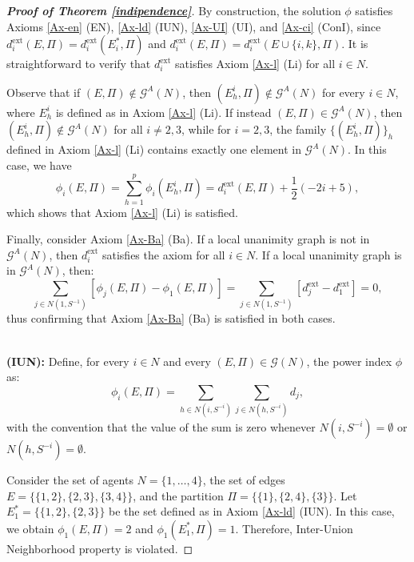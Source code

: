 \documentclass[preprint,11pt,authoryear]{elsarticle}
\theoremstyle{plain}
\begin{document}
\begin{proof}[\bf Proof of Theorem \ref{indipendence}]
	By construction, the solution $\phi$ satisfies Axioms \ref{Ax-en} (EN), \ref{Ax-ld} (IUN), \ref{Ax-UI} (UI), and \ref{Ax-ci} (ConI), since $d_i^{\text{ext}}(E,\Pi) = d_i^{\text{ext}}(E_i^*,\Pi)$ and $d_i^{\text{ext}}(E,\Pi) = d_i^{\text{ext}}(E \cup \{i,k\},\Pi)$. It is straightforward to verify that $d_i^{\text{ext}}$ satisfies Axiom \ref{Ax-l} (Li) for all $i \in N$. 
	
	Observe that if $(E,\Pi) \notin \mathcal{G}^A(N)$, then $(E_h^i,\Pi) \notin \mathcal{G}^A(N)$ for every $i \in N$, where $E_h^i$ is defined as in Axiom \ref{Ax-l} (Li). If instead $(E,\Pi) \in \mathcal{G}^A(N)$, then $(E_h^i,\Pi) \notin \mathcal{G}^A(N)$ for all $i \neq 2,3$, while for $i = 2,3$, the family $\{(E_h^i,\Pi)\}_h$ defined in Axiom \ref{Ax-l} (Li) contains exactly one element in $\mathcal{G}^A(N)$. In this case, we have
	\[
	\phi_i(E,\Pi) = \sum_{h=1}^p \phi_i(E_h^i,\Pi) = d_i^{\text{ext}}(E,\Pi) + \frac{1}{2}(-2i + 5),
	\]
	which shows that Axiom \ref{Ax-l} (Li) is satisfied. 
	
	
	Finally, consider Axiom \ref{Ax-Ba} (Ba). If a local unanimity graph is not in $\mathcal{G}^A(N)$, then $d_i^{\text{ext}}$ satisfies the axiom for all $i \in N$. If a local unanimity graph is in $\mathcal{G}^A(N)$, then:
	\[
	\sum_{j \in N(1,S^{-1})} \left[\phi_j(E,\Pi) - \phi_1(E,\Pi)\right] = \sum_{j \in N(1,S^{-1})} \left[d_j^{\text{ext}} - d_1^{\text{ext}}\right] = 0,
	\]
	thus confirming that Axiom \ref{Ax-Ba} (Ba) is satisfied in both cases.
	
	
	
	
	\noindent\vspace{.5\baselineskip}\\
	\textbf{(IUN):} 
	Define, for every $i \in N$ and every $(E, \Pi) \in \mathcal{G}(N)$, the power index $\phi$ as:
	\begin{equation*}
		\phi_i(E,\Pi) = \sum_{h \in N(i, S^{-i})} \sum_{j \in N(h, S^{-i})} d_j,
	\end{equation*}
	with the convention that the value of the sum is zero whenever $N(i, S^{-i}) = \emptyset$ or $N(h, S^{-i}) = \emptyset$. 
	
	Consider the set of agents $N = \{1, \ldots, 4\}$, the set of edges $E = \big\{\{1,2\}, \{2,3\}, \{3,4\}\big\}$, and the partition $\Pi = \big\{\{1\}, \{2,4\}, \{3\}\big\}$. Let $E_1^* = \big\{\{1,2\}, \{2,3\}\big\}$ be the set defined as in Axiom \ref{Ax-ld} (IUN). In this case, we obtain $\phi_1(E, \Pi) = 2$ and $\phi_1(E_1^*, \Pi) = 1$. Therefore, Inter-Union Neighborhood property is violated.
	

\end{proof}
\end{document}
